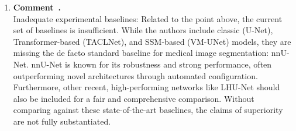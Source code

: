 \documentclass[11pt]{article}
\newcommand{\commentitem}{\item \textbf{Comment~\arabic{enumi}.}\\\ignorespaces}
\begin{document}
\begin{enumerate}
{    In summary, these results demonstrate that although UPED provides a meaningful and elegant performance gain within a standardized nnU-Net framework, it is not sufficient on its own to achieve performance comparable to the proposed method. The additional architectural components in SMC-Net are therefore necessary to fully exploit the UPED prior and address the challenges of OCT choroidal vessel and fluid segmentation.
    }
 
    \commentitem Inadequate experimental baselines: Related to the point above, the current set of baselines is insufficient. While the authors include classic (U-Net), Transformer-based (TACLNet), and SSM-based (VM-UNet) models, they are missing the de facto standard baseline for medical image segmentation: nnU-Net. nnU-Net is known for its robustness and strong performance, often outperforming novel architectures through automated configuration. Furthermore, other recent, high-performing networks like LHU-Net should also be included for a fair and comprehensive comparison. Without comparing against these state-of-the-art baselines, the claims of superiority are not fully substantiated.


\end{enumerate}
\end{document}
